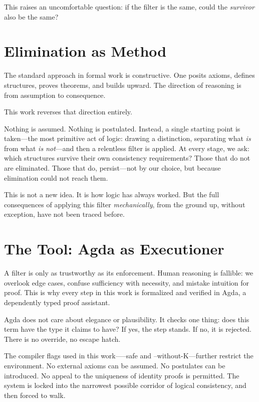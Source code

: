 \documentclass[11pt,a4paper]{book}
\def\texttt#1{#1}%
\begin{document}
This raises an uncomfortable question: if the filter is the same, could the \textit{survivor} also be the same?

\section{Elimination as Method}

The standard approach in formal work is constructive. One posits axioms, defines structures, proves theorems, and builds upward. The direction of reasoning is from assumption to consequence.

This work reverses that direction entirely.

Nothing is assumed. Nothing is postulated. Instead, a single starting point is taken—the most primitive act of logic: drawing a distinction, separating what \textit{is} from what \textit{is not}—and then a relentless filter is applied. At every stage, we ask: which structures survive their own consistency requirements? Those that do not are eliminated. Those that do, persist—not by our choice, but because elimination could not reach them.

This is not a new idea. It is how logic has always worked. But the full consequences of applying this filter \textit{mechanically}, from the ground up, without exception, have not been traced before.

\section{The Tool: Agda as Executioner}

A filter is only as trustworthy as its enforcement. Human reasoning is fallible: we overlook edge cases, confuse sufficiency with necessity, and mistake intuition for proof. This is why every step in this work is formalized and verified in Agda, a dependently typed proof assistant.

Agda does not care about elegance or plausibility. It checks one thing: does this term have the type it claims to have? If yes, the step stands. If no, it is rejected. There is no override, no escape hatch.

The compiler flags used in this work—\texttt{--safe} and \texttt{--without-K}—further restrict the environment. No external axioms can be assumed. No postulates can be introduced. No appeal to the uniqueness of identity proofs is permitted. The system is locked into the narrowest possible corridor of logical consistency, and then forced to walk.
\end{document}
